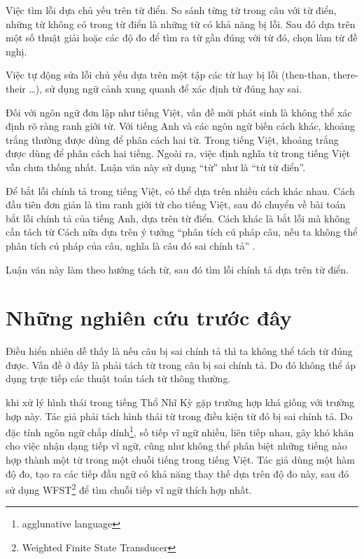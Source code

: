 \documentclass[a4paper,oneside]{book} %
\begin{document}
Việc tìm lỗi dựa chủ yếu trên từ điển. So sánh từng từ trong câu với từ điển, những từ
không có trong từ điển là những từ có khả năng bị lỗi. Sau đó dựa trên
một số thuật giải hoặc các độ đo để tìm ra từ gần đúng với từ đó, chọn làm
từ đề nghị.

Việc tự động sửa lỗi chủ yếu dựa trên một tập các từ hay bị lỗi (then-than,
there-their \ldots), sử dụng ngữ cảnh xung quanh để xác định từ đúng
hay sai.

Đối với ngôn ngữ đơn lập như tiếng Việt, vấn đề mới phát sinh là không
thể xác định rõ ràng ranh giới từ. Với tiếng Anh và các ngôn ngữ biến
cách khác, khoảng trắng thường được dùng để phân cách hai từ. Trong tiếng Việt,
khoảng trắng được dùng để phân cách hai tiếng. Ngoài ra, việc định
nghĩa từ trong tiếng Việt vẫn chưa thống nhất\cite{worddef}. Luận văn
này sử dụng ``từ'' như là ``từ từ điển''.  

Để bắt lỗi chính tả trong tiếng Việt, có thể dựa trên nhiều cách khác
nhau. Cách đầu tiên đơn giản là tìm ranh giới từ cho tiếng Việt, sau
đó chuyển về bài toán bắt lỗi chính tả của tiếng Anh, dựa trên từ
điển. Cách khác là bắt lỗi mà không cần tách từ\cite{Tuoi}
Cách nữa dựa trên ý tưởng ``phân tích cú pháp câu, nếu ta không thể
phân tích cú pháp của câu, nghĩa là câu đó sai chính tả'' \cite{iccc}.

Luận văn này làm theo hướng tách từ, sau đó tìm lỗi chính tả dựa trên
từ điển.

\section{Những nghiên cứu trước đây}

Điều hiển nhiên dễ thấy là nếu câu bị sai chính tả thì ta không thể
tách từ đúng được. Vấn đề ở đây là phải tách từ trong câu bị sai chính
tả. Do đó không thể áp dụng trực tiếp các thuật toán tách từ thông
thường. 

\cite{Oflazer} khi xử lý hình thái trong tiếng Thổ Nhĩ Kỳ gặp trường
hợp khá giống với trường hợp này. Tác giả phải tách hình thái từ
trong điều kiện từ đó bị sai chính tả. Do đặc tính
ngôn ngữ chắp dính\footnote{agglunative language}, số tiếp vĩ ngữ
nhiều, liên tiếp nhau, gây khó khăn cho việc nhận dạng tiếp vĩ ngữ,
cũng như không thể phân biệt những tiếng nào hợp thành một từ trong
một chuỗi tiếng trong tiếng Việt. Tác giả dùng một hàm độ đo, tạo ra
các tiếp đầu ngữ có khả năng thay thế dựa trên độ đo này, sau đó sử
dụng WFST\footnote{Weighted Finite State Transducer} để tìm chuỗi tiếp
vĩ ngữ thích hợp nhất.
\end{document}
